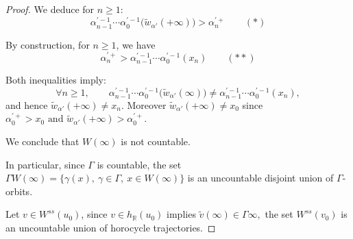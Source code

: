 \documentclass[a4paper,english,reqno]{amsart}
\newcommand{\R}{\mathbb{R}}
\theoremstyle{definition}
\numberwithin{equation}{section}
\begin{document}
\begin{proof}
We deduce for $n\geq 1$:
\[
\alpha_{n-1}^{\prime -1}\cdots \alpha_0^{\prime -1}
\bigl(\tilde w_{\alpha'}(+\infty)\bigr)
>
\alpha_n^{\prime +}
\qquad (*)
\]

By construction, for $n\geq 1$, we have
\[
\alpha_n^{\prime +}>
\alpha_{n-1}^{\prime -1}\cdots \alpha_0^{\prime -1}(x_n)
\qquad (**)
\]

Both inequalities imply:
\[
\forall n\geq 1,\qquad
\alpha_{n-1}^{\prime -1}\cdots \alpha_0^{\prime -1}
\bigl(\tilde w_{\alpha'}(\infty)\bigr)
\neq
\alpha_{n-1}^{\prime -1}\cdots \alpha_0^{\prime -1}(x_n),
\]
and hence
$
\tilde w_{\alpha'}(+\infty)\neq x_n.
$
Moreover
$
\tilde w_{\alpha'}(+\infty)\neq x_0
$
since
$
\alpha_0^{\prime +}>x_0
\text{ and }
\tilde w_{\alpha'}(+\infty)>\alpha_0^{\prime +}.
$

We conclude that $W(\infty)$ is not countable.

In particular, since $\Gamma$ is countable, the set
$
\Gamma W(\infty)=\{\gamma(x),\ \gamma\in\Gamma,\ x\in W(\infty)\}
$
is an uncountable disjoint union of $\Gamma$-orbits.

Let $v\in W^{ss}(u_0)$, since $v\in h_\R(u_0)$
implies
$
\tilde v(\infty)\in \Gamma\infty,
$
the set $W^{ss}(v_0)$ is an uncountable union of horocycle trajectories.


\end{proof}


	
	
\end{document}
